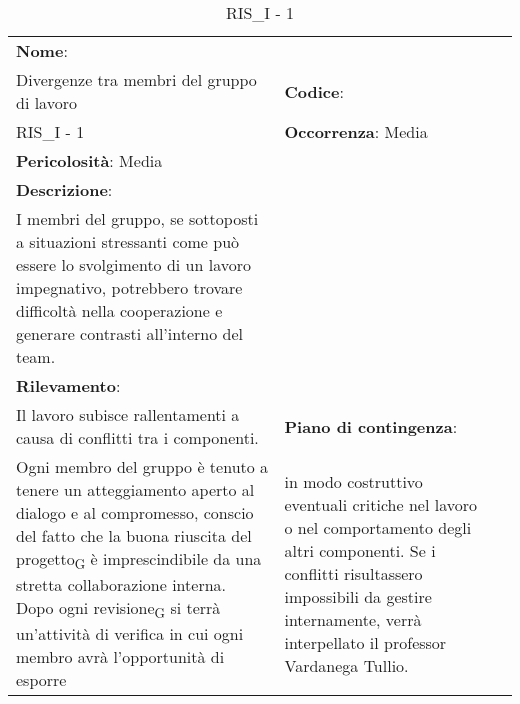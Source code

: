 \renewcommand{\arraystretch}{1.5}
\begin{longtable} { 
		>{\raggedright}p{} 
		>{\raggedright}p{} 
		>{\raggedright}p{}    }
	
	\caption{RIS\_I - 1} \endhead	
	
	
	\textbf{Nome}: \\ Divergenze tra membri del gruppo di lavoro
	& \textbf{Codice}: \\ RIS\_I - 1
	& \textbf{Occorrenza}: Media \\ \textbf{Pericolosità}: Media
	
	\tabularnewline
	
	\textbf{Descrizione}: \\ I membri del gruppo, se sottoposti a situazioni stressanti come può essere lo svolgimento di un lavoro impegnativo, potrebbero trovare difficoltà nella cooperazione e generare contrasti all'interno del team.
	\\
	
	\textbf{Rilevamento}: \\ Il lavoro subisce rallentamenti a causa di conflitti tra i componenti.
	& 
	\textbf{Piano di contingenza}: \\ Ogni membro del gruppo è tenuto a tenere un atteggiamento aperto al dialogo e al compromesso, conscio del fatto che la buona riuscita del progetto\textsubscript{G} è imprescindibile da una stretta collaborazione interna. Dopo ogni revisione\textsubscript{G} si terrà un'attività di verifica in cui ogni membro avrà l'opportunità di esporre 
	&  
	in modo costruttivo eventuali critiche nel lavoro o nel comportamento degli altri componenti. Se i conflitti risultassero impossibili da gestire internamente, verrà interpellato il professor Vardanega Tullio.
	
\end{longtable}











